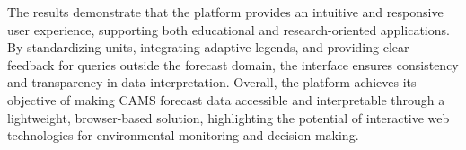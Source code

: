 The results demonstrate that the platform provides an intuitive and responsive user experience, supporting both educational and research-oriented applications. By standardizing units, integrating adaptive legends, and providing clear feedback for queries outside the forecast domain, the interface ensures consistency and transparency in data interpretation. Overall, the platform achieves its objective of making CAMS forecast data accessible and interpretable through a lightweight, browser-based solution, highlighting the potential of interactive web technologies for environmental monitoring and decision-making.

